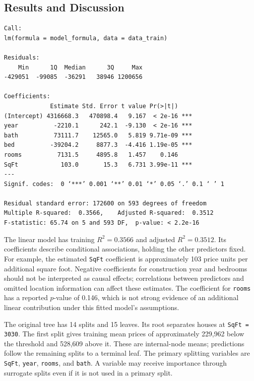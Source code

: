 \documentclass[11pt,a4paper]{article}
\begin{document}
\subsection{Results and Discussion}
\par\noindent\begin{minipage}{\linewidth}
\begin{lstlisting}[style=console]
Call:
lm(formula = model_formula, data = data_train)

Residuals:
    Min      1Q  Median      3Q     Max 
-429051  -99085  -36291   38946 1200656 

Coefficients:
             Estimate Std. Error t value Pr(>|t|)    
(Intercept) 4316668.3   470898.4   9.167  < 2e-16 ***
year          -2210.1      242.1  -9.130  < 2e-16 ***
bath          73111.7    12565.0   5.819 9.71e-09 ***
bed          -39204.2     8877.3  -4.416 1.19e-05 ***
rooms          7131.5     4895.8   1.457    0.146    
SqFt            103.0       15.3   6.731 3.99e-11 ***
---
Signif. codes:  0 ‘***’ 0.001 ‘**’ 0.01 ‘*’ 0.05 ‘.’ 0.1 ‘ ’ 1

Residual standard error: 172600 on 593 degrees of freedom
Multiple R-squared:  0.3566,	Adjusted R-squared:  0.3512 
F-statistic: 65.74 on 5 and 593 DF,  p-value: < 2.2e-16
\end{lstlisting}
\end{minipage}\par
The linear model has training $R^2=0.3566$ and adjusted $R^2=0.3512$. Its coefficients describe conditional associations, holding the other predictors fixed. For example, the estimated \texttt{SqFt} coefficient is approximately 103 price units per additional square foot. Negative coefficients for construction year and bedrooms should not be interpreted as causal effects; correlations between predictors and omitted location information can affect these estimates. The coefficient for \texttt{rooms} has a reported $p$-value of 0.146, which is not strong evidence of an additional linear contribution under this fitted model's assumptions.

The original tree has 14 splits and 15 leaves. Its root separates houses at \texttt{SqFt = 3030}. The first split gives training mean prices of approximately 229,962 below the threshold and 528,609 above it. These are internal-node means; predictions follow the remaining splits to a terminal leaf. The primary splitting variables are \texttt{SqFt}, \texttt{year}, \texttt{rooms}, and \texttt{bath}. A variable may receive importance through surrogate splits even if it is not used in a primary split.
\end{document}
